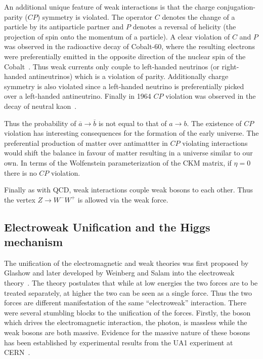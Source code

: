 An additional unique feature of weak interactions is that the charge conjugation-parity ($CP$) symmetry is violated. The operator $C$ denotes the change of a particle by its antiparticle partner and $P$ denotes a reversal of helicity (the projection of spin onto the momentum of a particle). A clear violation of $C$ and $P$ was observed in the radioactive decay of Cobalt-60, where the resulting electrons were preferentially emitted in the opposite direction of the nuclear spin of the Cobalt~\cite{Experimentalb}. Thus weak currents only couple to left-handed neutrinos (or right-handed antineutrinos) which is a violation of parity. Additionally charge symmetry is also violated since a left-handed neutrino is preferentially picked over a left-handed antineutrino. Finally in 1964 $CP$ violation was observed in the decay of neutral kaon~\cite{Evidence}.

Thus the probability of $\overline{a}\rightarrow \overline{b}$ is not equal to that of $a\rightarrow b$. The existence of $CP$ violation has interesting consequences for the formation of the early universe. The preferential production of matter over antimattter in $CP$ violating interactions would shift the balance in favour of matter resulting in a universe similar to our own. In terms of the Wolfenstein parameterization of the CKM matrix, if $\eta=0$ there is no $CP$ violation.

Finally as with QCD, weak interactions couple weak bosons to each other. Thus the vertex $Z\rightarrow W^-W^+$ is allowed via the weak force.

\subsection{Electroweak Unification and the Higgs mechanism}

The unification of the electromagnetic and weak theories was first proposed by Glashow and later developed by Weinberg and Salam into the electroweak theory~\cite{Model,Theory:WeakInteractionsGlashow,Theory:WeakAndEMSalam}. The theory postulates that while at low energies the two forces are to be treated separately, at higher the two can be seen as a single force. Thus the two forces are different manifestation of the same ``electroweak'' interaction. There were several stumbling blocks to the unification of the forces. Firstly, the boson which drives the electromagnetic interaction, the photon, is massless while the weak bosons are both massive. Evidence for the massive nature of these bosons has been established by experimental results from the UA1 experiment at CERN~\cite{Theory:WBosonObservationPaper}.

